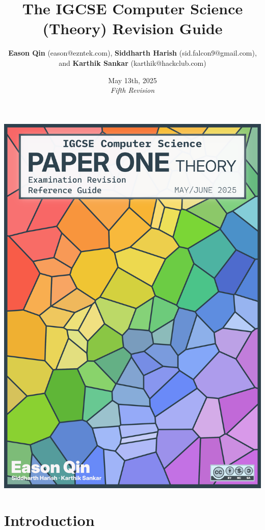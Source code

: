 \documentclass[a4paper, oneside, 11pt]{book} %
\title{The IGCSE Computer Science (Theory) Revision Guide}
\author{\textbf{Eason Qin} (eason@ezntek.com), \textbf{Siddharth Harish} (sid.falcon9@gmail.com), \\and \textbf{Karthik Sankar} (karthik@hackclub.com)}
\date{May 13th, 2025\\\emph{Fifth Revision}}
\begin{document}

\clearpage
\thispagestyle{empty}
\noindent
\includegraphics[width=\paperwidth,height=\paperheight,keepaspectratio=false]{cover.png}
\clearpage
\restoregeometry

\maketitle
\label{table-of-contents}
\tableofcontents

\chapter*{Introduction}
\label{introduction}

\end{document}
